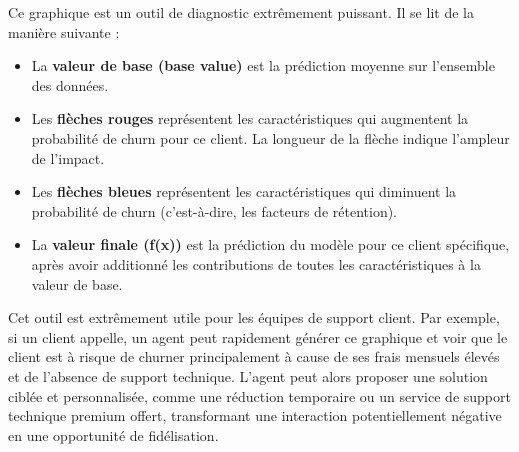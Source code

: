 Ce graphique est un outil de diagnostic extrêmement puissant. Il se lit de la manière suivante :
\begin{itemize}
    \item La \textbf{valeur de base (base value)} est la prédiction moyenne sur l'ensemble des données.
    \item Les \textbf{flèches rouges} représentent les caractéristiques qui augmentent la probabilité de churn pour ce client. La longueur de la flèche indique l'ampleur de l'impact.
    \item Les \textbf{flèches bleues} représentent les caractéristiques qui diminuent la probabilité de churn (c'est-à-dire, les facteurs de rétention).
    \item La \textbf{valeur finale (f(x))} est la prédiction du modèle pour ce client spécifique, après avoir additionné les contributions de toutes les caractéristiques à la valeur de base.
\end{itemize}

Cet outil est extrêmement utile pour les équipes de support client. Par exemple, si un client appelle, un agent peut rapidement générer ce graphique et voir que le client est à risque de churner principalement à cause de ses frais mensuels élevés et de l'absence de support technique. L'agent peut alors proposer une solution ciblée et personnalisée, comme une réduction temporaire ou un service de support technique premium offert, transformant une interaction potentiellement négative en une opportunité de fidélisation.

